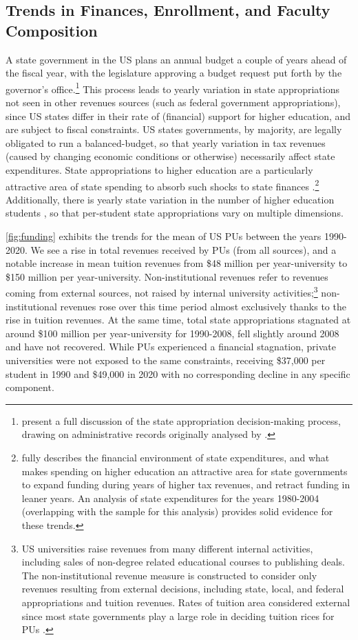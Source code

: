 \documentclass[notitlepage,12pt]{article}
\begin{document}
\subsection{Trends in Finances, Enrollment, and Faculty Composition}
\label{sec:trends}
A state government in the US plans an annual budget a couple of years ahead of the fiscal year, with the legislature approving a budget request put forth by the governor's office.\footnote{
    \cite{NBERw23736} present a full discussion of the state appropriation decision-making process, drawing on administrative records originally analysed by \cite{parmley2009state}.}
This process leads to yearly variation in state appropriations not seen in other revenues sources (such as federal government appropriations), since US states differ in their rate of (financial) support for higher education, and are subject to fiscal constraints.
US states governments, by majority, are legally obligated to run a balanced-budget, so that yearly variation in tax revenues (caused by changing economic conditions or otherwise) necessarily affect state expenditures.
State appropriations to higher education are a particularly attractive area of state spending to absorb such shocks to state finances \citep{delaney2011state}.\footnote{
    \cite{delaney2011state} fully describes the financial environment of state expenditures, and what makes spending on higher education an attractive area for state governments to expand funding during years of higher tax revenues, and retract funding in leaner years.
    An analysis of state expenditures for the years 1980-2004 (overlapping with the sample for this analysis) provides solid evidence for these trends.
}
Additionally, there is yearly state variation in the number of higher education students \citep{turner2014impact}, so that per-student state appropriations vary on multiple dimensions.

\autoref{fig:funding} exhibits the trends for the mean of US PUs between the years 1990-2020.
We see a rise in total revenues received by PUs (from all sources), and a notable increase in mean tuition revenues from \$48 million per year-university to \$150 million per year-university. 
Non-institutional revenues refer to revenues coming from external sources, not raised by internal university activities;\footnote{
    US universities raise revenues from many different internal activities, including sales of non-degree related educational courses to publishing deals.
    The non-institutional revenue measure is constructed to consider only revenues resulting from external decisions, including state, local, and federal appropriations and tuition revenues.
    Rates of tuition area considered external since most state governments play a large role in deciding tuition rices for PUs \citep{NBERw23736}.
}
non-institutional revenues rose over this time period almost exclusively thanks to the rise in tuition revenues.
At the same time, total state appropriations stagnated at around \$100 million per year-university for 1990-2008, fell slightly around 2008 and have not recovered.
While PUs experienced a financial stagnation, private universities were not exposed to the same constraints, receiving \$37,000 per student in 1990 and \$49,000 in 2020 with no corresponding decline in any specific component.
\end{document}
